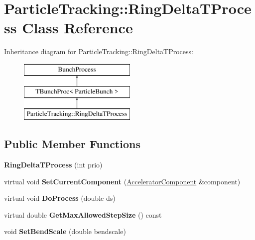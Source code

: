 \hypertarget{classParticleTracking_1_1RingDeltaTProcess}{}\section{Particle\+Tracking\+:\+:Ring\+Delta\+T\+Process Class Reference}
\label{classParticleTracking_1_1RingDeltaTProcess}
Inheritance diagram for Particle\+Tracking\+:\+:Ring\+Delta\+T\+Process\+:\begin{figure}[H]
\begin{center}
\leavevmode
\includegraphics[height=3.000000cm]{classParticleTracking_1_1RingDeltaTProcess}
\end{center}
\end{figure}
\subsection*{Public Member Functions}
\begin{DoxyCompactItemize}
\item 
\mbox{\label{classParticleTracking_1_1RingDeltaTProcess_aae9a58a04bf5e4926138391fef8135fb}} 
{\bfseries Ring\+Delta\+T\+Process} (int prio)
\item 
\mbox{\label{classParticleTracking_1_1RingDeltaTProcess_ac09d91dae0824e02bcbe8852b3d95994}} 
virtual void {\bfseries Set\+Current\+Component} (\hyperlink{classAcceleratorComponent}{Accelerator\+Component} \&component)
\item 
\mbox{\label{classParticleTracking_1_1RingDeltaTProcess_acd6de9e4daafecfcc228577602a3606d}} 
virtual void {\bfseries Do\+Process} (double ds)
\item 
\mbox{\label{classParticleTracking_1_1RingDeltaTProcess_a2db8727253d919f7581dfa9cc782b049}} 
virtual double {\bfseries Get\+Max\+Allowed\+Step\+Size} () const
\item 
\mbox{\label{classParticleTracking_1_1RingDeltaTProcess_a3cf981c6176b8c80b24fe03c07a0497b}} 
void {\bfseries Set\+Bend\+Scale} (double bendscale)
\end{DoxyCompactItemize}
